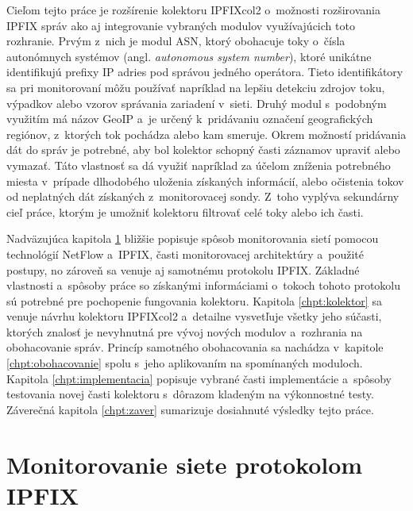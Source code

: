 Cieľom tejto práce je rozšírenie kolektoru IPFIXcol2 o~možnosti rozširovania IPFIX správ ako aj integrovanie vybraných modulov využívajúcich toto rozhranie.
Prvým z~nich je modul ASN, ktorý obohacuje toky o~čísla autonómnych systémov (angl. \textit{autonomous system number}), ktoré unikátne identifikujú prefixy IP adries pod správou jedného operátora.
Tieto identifikátory sa pri monitorovaní môžu používať napríklad na lepšiu detekciu zdrojov toku, výpadkov alebo vzorov správania zariadení v~sieti.
Druhý modul s~podobným využitím má názov GeoIP a~je určený k~pridávaniu označení geografických regiónov, z~ktorých tok pochádza alebo kam smeruje.
Okrem možností pridávania dát do správ je potrebné, aby bol kolektor schopný časti záznamov upraviť alebo vymazať.
Táto vlastnosť sa dá využiť napríklad za účelom zníženia potrebného miesta v~prípade dlhodobého uloženia získaných informácií, alebo očistenia tokov od neplatných dát získaných z~monitorovacej sondy.
Z~toho vyplýva sekundárny cieľ práce, ktorým je umožniť kolektoru filtrovať celé toky alebo ich časti.

Nadväzujúca kapitola \ref{chpt:monitorovanie} bližšie popisuje spôsob monitorovania sietí pomocou technológií NetFlow a~IPFIX, časti monitorovacej architektúry a~použité postupy, no zároveň sa venuje
aj samotnému protokolu IPFIX. Základné vlastnosti a~spôsoby práce so získanými informáciami o~tokoch tohoto protokolu sú potrebné pre pochopenie fungovania kolektoru. Kapitola \ref{chpt:kolektor} sa venuje návrhu kolektoru IPFIXcol2 a~detailne vysvetľuje
všetky jeho súčasti, ktorých znalosť je nevyhnutná pre vývoj nových modulov a~rozhrania na obohacovanie správ. Princíp samotného obohacovania sa nachádza v~kapitole \ref{chpt:obohacovanie} spolu s~jeho
aplikovaním na spomínaných moduloch. Kapitola \ref{chpt:implementacia} popisuje vybrané časti implementácie a~spôsoby testovania novej časti kolektoru s~dôrazom kladeným na výkonnostné testy.
Záverečná kapitola \ref{chpt:zaver} sumarizuje dosiahnuté výsledky tejto práce.


\chapter{Monitorovanie siete protokolom IPFIX}
\label{chpt:monitorovanie}

